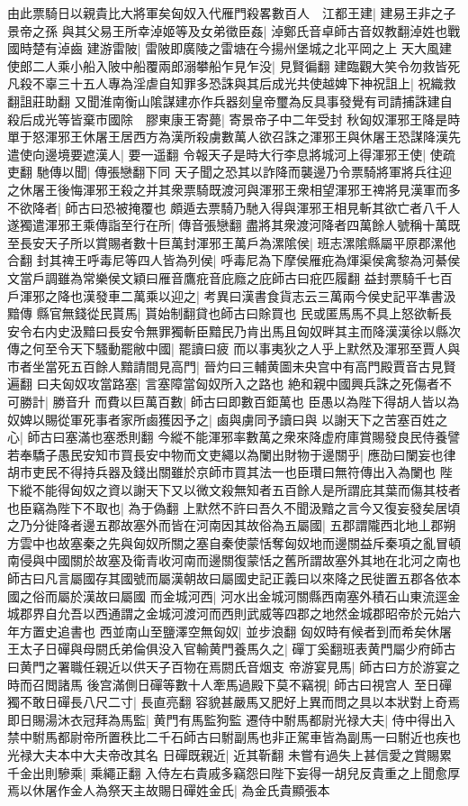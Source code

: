由此票騎日以親貴比大將軍矣匈奴入代雁門殺畧數百人　江都王建|{
	建易王非之子景帝之孫}
與其父易王所幸淖姬等及女弟徵臣姦|{
	淖鄭氏音卓師古音奴教翻淖姓也戰國時楚有淖齒}
建游雷陂|{
	雷陂即廣陵之雷塘在今揚州堡城之北平岡之上}
天大風建使郎二人乘小船入陂中船覆兩郎溺攀船乍見乍没|{
	見賢徧翻}
建臨觀大笑令勿救皆死凡殺不辜三十五人專為淫虐自知罪多恐誅與其后成光共使越婢下神祝詛上|{
	祝織救翻詛莊助翻}
又聞淮南衡山隂謀建亦作兵器刻皇帝璽為反具事發覺有司請捕誅建自殺后成光等皆棄市國除　膠東康王寄薨|{
	寄景帝子中二年受封}
秋匈奴渾邪王降是時單于怒渾邪王休屠王居西方為漢所殺虜數萬人欲召誅之渾邪王與休屠王恐謀降漢先遣使向邊境要遮漢人|{
	要一遥翻}
令報天子是時大行李息將城河上得渾邪王使|{
	使疏吏翻}
馳傳以聞|{
	傳張戀翻下同}
天子聞之恐其以詐降而襲邊乃令票騎將軍將兵往迎之休屠王後悔渾邪王殺之并其衆票騎既渡河與渾邪王衆相望渾邪王禆將見漢軍而多不欲降者|{
	師古曰恐被掩覆也}
頗遁去票騎乃馳入得與渾邪王相見斬其欲亡者八千人遂獨遣渾邪王乘傳詣至行在所|{
	傳音張戀翻}
盡將其衆渡河降者四萬餘人號稱十萬既至長安天子所以賞賜者數十巨萬封渾邪王萬戶為漯隂侯|{
	班志漯隂縣屬平原郡漯他合翻}
封其禆王呼毒尼等四人皆為列侯|{
	呼毒尼為下摩侯雁疪為煇渠侯禽黎為河綦侯文當戶調雖為常樂侯文穎曰雁音鷹疪音庇廕之庇師古曰疪匹履翻}
益封票騎千七百戶渾邪之降也漢發車二萬乘以迎之|{
	考異曰漢書食貨志云三萬兩今侯史記平凖書汲黯傳}
縣官無錢從民貰馬|{
	貰始制翻貸也師古曰賖買也}
民或匿馬馬不具上怒欲斬長安令右内史汲黯曰長安令無罪獨斬臣黯民乃肯出馬且匈奴畔其主而降漢漢徐以縣次傳之何至令天下騷動罷敝中國|{
	罷讀曰疲}
而以事夷狄之人乎上默然及渾邪至賈人與市者坐當死五百餘人黯請間見高門|{
	晉灼曰三輔黄圖未央宫中有高門殿賈音古見賢遍翻}
曰夫匈奴攻當路塞|{
	言塞障當匈奴所入之路也}
絶和親中國興兵誅之死傷者不可勝計|{
	勝音升}
而費以巨萬百數|{
	師古曰即數百鉅萬也}
臣愚以為陛下得胡人皆以為奴婢以賜從軍死事者家所鹵獲因予之|{
	鹵與虜同予讀曰與}
以謝天下之苦塞百姓之心|{
	師古曰塞滿也塞悉則翻}
今縱不能渾邪率數萬之衆來降虚府庫賞賜發良民侍養譬若奉驕子愚民安知市買長安中物而文吏繩以為闌出財物于邊關乎|{
	應劭曰闌妄也律胡市吏民不得持兵器及錢出關雖於京師市買其法一也臣瓚曰無符傳出入為闌也}
陛下縱不能得匈奴之資以謝天下又以微文殺無知者五百餘人是所謂庇其葉而傷其枝者也臣竊為陛下不取也|{
	為于偽翻}
上默然不許曰吾久不聞汲黯之言今又復妄發矣居頃之乃分徙降者邊五郡故塞外而皆在河南因其故俗為五屬國|{
	五郡謂隴西北地丄郡朔方雲中也故塞秦之先與匈奴所關之塞自秦使蒙恬奪匈奴地而邊關益斥秦項之亂冒頓南侵與中國關於故塞及衛青收河南而邊關復蒙恬之舊所謂故塞外其地在北河之南也師古曰凡言屬國存其國號而屬漢朝故曰屬國史記正義曰以來降之民徙置五郡各依本國之俗而屬於漢故曰屬國}
而金城河西|{
	河水出金城河關縣西南塞外積石山東流逕金城郡界自允吾以西通謂之金城河渡河而西則武威等四郡之地然金城郡昭帝於元始六年方置史追書也}
西並南山至鹽澤空無匈奴|{
	並步浪翻}
匈奴時有候者到而希矣休屠王太子日磾與母閼氏弟倫俱没入官輸黄門養馬久之|{
	磾丁奚翻班表黄門屬少府師古曰黄門之署職任親近以供天子百物在焉閼氏音烟支}
帝游宴見馬|{
	師古曰方於游宴之時而召閲諸馬}
後宫滿側日磾等數十人牽馬過殿下莫不竊視|{
	師古曰視宫人}
至日磾獨不敢日磾長八尺二寸|{
	長直亮翻}
容貌甚嚴馬又肥好上異而問之具以本狀對上奇焉即日賜湯沐衣冠拜為馬監|{
	黄門有馬監狗監}
遷侍中駙馬都尉光禄大夫|{
	侍中得出入禁中駙馬都尉帝所置秩比二千石師古曰駙副馬也非正駕車皆為副馬一曰駙近也疾也光禄大夫本中大夫帝改其名}
日磾既親近|{
	近其靳翻}
未嘗有過失上甚信愛之賞賜累千金出則驂乘|{
	乘繩正翻}
入侍左右貴戚多竊怨曰陛下妄得一胡兒反貴重之上聞愈厚焉以休屠作金人為祭天主故賜日磾姓金氏|{
	為金氏貴顯張本}


